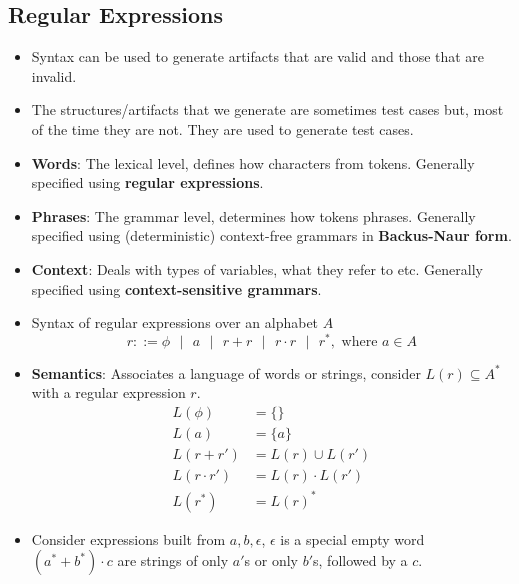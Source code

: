 \documentclass[a4paper]{article}
\begin{document}
\subsection{Regular Expressions}
\begin{itemize}
    \item Syntax can be used to generate artifacts that are valid and those that are invalid.
    \item The structures/artifacts that we generate are sometimes test cases but, most of the time they are not. They are used to generate test cases.
    \item \textbf{Words}: The lexical level, defines how characters from tokens. Generally specified using \textbf{regular expressions}.
    \item \textbf{Phrases}: The grammar level, determines how tokens phrases. Generally specified using (deterministic) context-free grammars in \textbf{Backus-Naur form}.
    \item \textbf{Context}: Deals with types of variables, what they refer to etc. Generally specified using \textbf{context-sensitive grammars}.
    \item Syntax of regular expressions over an alphabet $A$
    \begin{equation*}
        r::=\phi \text{ }|\text{ } a\text{ }|\text{ } r+r\text{ }|\text{ }r\cdot r\text{ }|\text{ }r^*,\text{   where }a\in A
    \end{equation*}
    \item \textbf{Semantics}: Associates a language of words or strings, consider $L(r)\subseteq A^*$ with a regular expression $r$.
    \begin{equation*}
        \begin{split}
            L(\phi)&=\{\}\\
            L(a)&=\{a\}\\
            L(r+r')&=L(r)\cup L(r')\\
            L(r\cdot r')&=L(r)\cdot L(r')\\
            L(r^*)&=L(r)^*
        \end{split}
    \end{equation*}
    \item Consider expressions built from $a,b,\epsilon$, $\epsilon$ is a special empty word\\
    $(a^*+b^*)\cdot c$ are strings of only $a'$s or only $b'$s, followed by a $c$.
    \begin{figure}[H]
        \centering
        \begin{tikzpicture}[%
          sibling distance=8em,
          level distance=3em,
          edge from parent/.style={draw},
          every node/.style={font=\footnotesize}]
        

\end{tikzpicture}
\end{figure}
\end{itemize}
\end{document}
